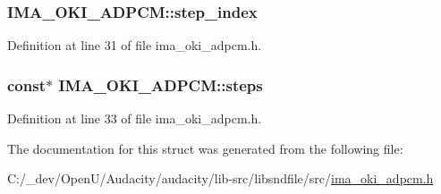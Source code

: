 \subsubsection[{\texorpdfstring{step\+\_\+index}{step_index}}]{ I\+M\+A\+\_\+\+O\+K\+I\+\_\+\+A\+D\+P\+C\+M\+::step\+\_\+index}\hypertarget{struct_i_m_a___o_k_i___a_d_p_c_m_ad4eb450df57148fd979808a79a4469d6}{}\label{struct_i_m_a___o_k_i___a_d_p_c_m_ad4eb450df57148fd979808a79a4469d6}


Definition at line 31 of file ima\+\_\+oki\+\_\+adpcm.\+h.

\subsubsection[{\texorpdfstring{steps}{steps}}]{ {\bf const}$\ast$ I\+M\+A\+\_\+\+O\+K\+I\+\_\+\+A\+D\+P\+C\+M\+::steps}\hypertarget{struct_i_m_a___o_k_i___a_d_p_c_m_ac7996ca4699d1e0694e4dc90ba0d9355}{}\label{struct_i_m_a___o_k_i___a_d_p_c_m_ac7996ca4699d1e0694e4dc90ba0d9355}


Definition at line 33 of file ima\+\_\+oki\+\_\+adpcm.\+h.



The documentation for this struct was generated from the following file\+:\begin{DoxyCompactItemize}
\item 
C\+:/\+\_\+dev/\+Open\+U/\+Audacity/audacity/lib-\/src/libsndfile/src/\hyperlink{ima__oki__adpcm_8h}{ima\+\_\+oki\+\_\+adpcm.\+h}\end{DoxyCompactItemize}
